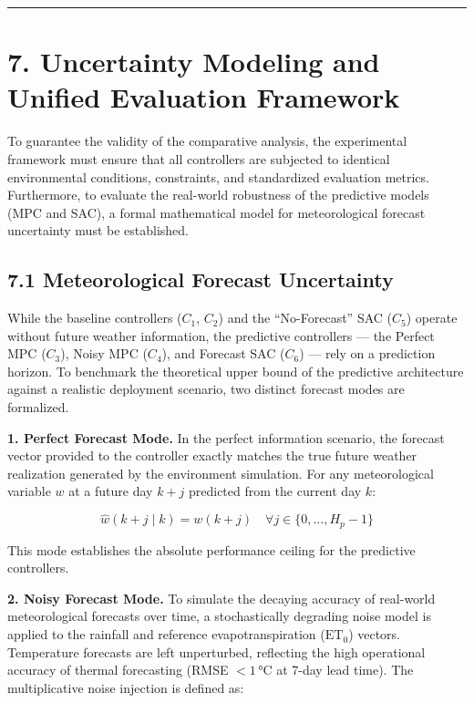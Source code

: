 \begin{center}\rule{0.5\linewidth}{0.5pt}\end{center}

\section{7. Uncertainty Modeling and Unified Evaluation
Framework}\label{uncertainty-modeling-and-unified-evaluation-framework}

To guarantee the validity of the comparative analysis, the experimental
framework must ensure that all controllers are subjected to identical
environmental conditions, constraints, and standardized evaluation
metrics. Furthermore, to evaluate the real-world robustness of the
predictive models (MPC and SAC), a formal mathematical model for
meteorological forecast uncertainty must be established.

\subsection{7.1 Meteorological Forecast
Uncertainty}\label{meteorological-forecast-uncertainty}

While the baseline controllers (\(C_1\), \(C_2\)) and the
``No-Forecast'' SAC (\(C_5\)) operate without future weather
information, the predictive controllers --- the Perfect MPC (\(C_3\)),
Noisy MPC (\(C_4\)), and Forecast SAC (\(C_6\)) --- rely on a prediction
horizon. To benchmark the theoretical upper bound of the predictive
architecture against a realistic deployment scenario, two distinct
forecast modes are formalized.

\textbf{1. Perfect Forecast Mode.} In the perfect information scenario,
the forecast vector provided to the controller exactly matches the true
future weather realization generated by the environment simulation. For
any meteorological variable \(w\) at a future day \(k + j\) predicted
from the current day \(k\):

\[\hat{w}(k+j \mid k) = w(k+j) \quad \forall j \in \{0, \ldots, H_p - 1\} \tag{25}\]

This mode establishes the absolute performance ceiling for the
predictive controllers.

\textbf{2. Noisy Forecast Mode.} To simulate the decaying accuracy of
real-world meteorological forecasts over time, a stochastically
degrading noise model is applied to the rainfall and reference
evapotranspiration (\(\text{ET}_0\)) vectors. Temperature forecasts are
left unperturbed, reflecting the high operational accuracy of thermal
forecasting (RMSE \(< 1\,°\)C at 7-day lead time). The multiplicative
noise injection is defined as:


